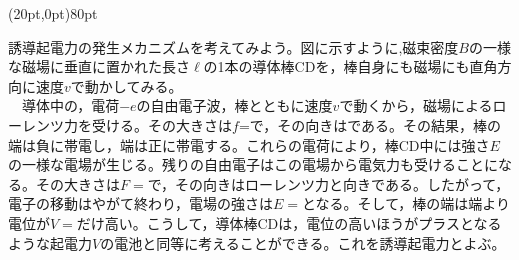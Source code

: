 \hakosyokika
\item
    \begin{mawarikomi}(20pt,0pt){80pt}{
        
    }
    誘導起電力の発生メカニズムを考えてみよう。図に示すように,磁束密度$B$の一様な磁場に垂直に置かれた長さ$\ell$の1本の導体棒CDを，棒自身にも磁場にも直角方向に速度$v$で動かしてみる。\\
    ~~導体中の，電荷$-e$の自由電子波，棒とともに速度$v$で動くから，磁場によるローレンツ力を受ける。その大きさは$f$=\Hako {}で，その向きは\Hako である。その結果，棒の\Hako 端は負に帯電し，\Hako 端は正に帯電する。これらの電荷により，棒CD中には強さ$E$の一様な電場が生じる。残りの自由電子はこの電場から電気力も受けることになる。その大きさは$F=$\Hako {}で，その向きはローレンツ力と\Hako 向きである。したがって，電子の移動はやがて終わり，電場の強さは$E=$\Hako {}となる。そして，棒の\Hako 端は\Hako 端より電位が$V=$\Hako {}だけ高い。こうして，導体棒CDは，電位の高いほうがプラスとなるような起電力$V$の電池と同等に考えることができる。これを誘導起電力とよぶ。
    \end{mawarikomi}
